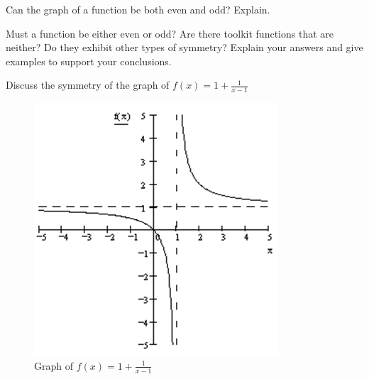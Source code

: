 \documentclass[10pt,]{book}
\theoremstyle{ptxdefinitionnotitle}
\theoremstyle{ptxdefinitiontitle}
\numberwithin{equation}{section}
\begin{document}
\begin{divisionexercise}{9}\hypertarget{exercise-19}{}
\hypertarget{p-71}{}%
Can the graph of a function be both even and odd?  Explain.%
\end{divisionexercise}%
\begin{divisionexercise}{10}\hypertarget{exercise-20}{}
\hypertarget{p-72}{}%
Must a function be either even or odd?  Are there toolkit functions that are neither?  Do they exhibit other types of symmetry?  Explain your answers and give examples to support your conclusions.%
\end{divisionexercise}%
\begin{divisionexercise}{11}\hypertarget{exercise-21}{}
\hypertarget{p-73}{}%
Discuss the symmetry of the graph of \(f(x) = 1 + \frac{1}{x-1}\)%
\begin{figure}
\centering
\includegraphics[width=0.5\linewidth]{./src/images/chapter02/chapter02section02-exercise11.png}
\caption{Graph of \(f(x) = 1 + \frac{1}{x-1}\)\label{chapter02-section02-exercise11-figure}}
\end{figure}
\end{divisionexercise}%
\end{document}
